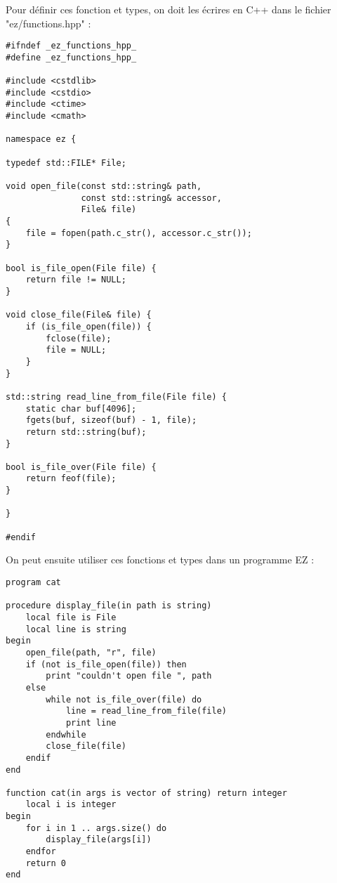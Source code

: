 Pour définir ces fonction et types, on doit les écrires en C++ dans le
fichier "ez/functions.hpp" :
\begin{verbatim}
#ifndef _ez_functions_hpp_
#define _ez_functions_hpp_

#include <cstdlib>
#include <cstdio>
#include <ctime>
#include <cmath>

namespace ez {

typedef std::FILE* File;

void open_file(const std::string& path,
               const std::string& accessor,
               File& file)
{
    file = fopen(path.c_str(), accessor.c_str());
}

bool is_file_open(File file) {
    return file != NULL;
}

void close_file(File& file) {
    if (is_file_open(file)) {
        fclose(file);
        file = NULL;
    }
}

std::string read_line_from_file(File file) {
    static char buf[4096];
    fgets(buf, sizeof(buf) - 1, file);
    return std::string(buf);
}

bool is_file_over(File file) {
    return feof(file);
}

}

#endif
\end{verbatim}

On peut ensuite utiliser ces fonctions et types dans un programme EZ :
\begin{verbatim}
program cat

procedure display_file(in path is string)
    local file is File
    local line is string
begin
    open_file(path, "r", file)
    if (not is_file_open(file)) then
        print "couldn't open file ", path
    else
        while not is_file_over(file) do
            line = read_line_from_file(file)
            print line
        endwhile
        close_file(file)
    endif
end

function cat(in args is vector of string) return integer
    local i is integer
begin
    for i in 1 .. args.size() do
        display_file(args[i])
    endfor
    return 0
end
\end{verbatim}

